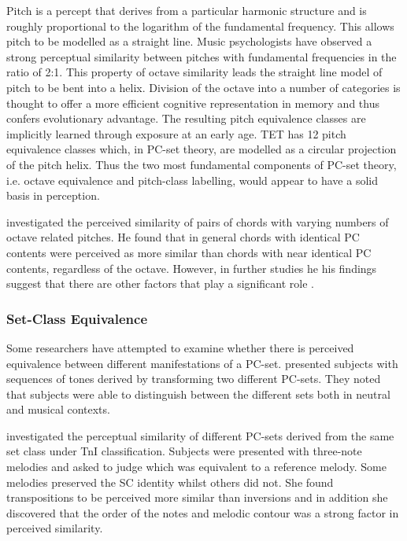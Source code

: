 \documentclass{article}
\begin{document}
Pitch is a percept that derives from a particular harmonic structure
and is roughly proportional to the logarithm of the fundamental
frequency. This allows pitch to be modelled as a straight line. Music
psychologists have observed a strong perceptual similarity between
pitches with fundamental frequencies in the ratio of 2:1. This
property of octave similarity leads the straight line model of pitch
to be bent into a helix. Division of the octave into a number of
categories is thought to offer a more efficient cognitive
representation in memory and thus confers evolutionary advantage. The
resulting pitch equivalence classes are implicitly learned through
exposure at an early age. TET has 12 pitch equivalence classes which,
in PC-set theory, are modelled as a circular projection of the pitch
helix. Thus the two most fundamental components of PC-set theory,
i.e. octave equivalence and pitch-class labelling, would appear to
have a solid basis in perception.

\citet{Gibson1988} investigated the perceived similarity of pairs of
chords with varying numbers of octave related pitches. He found that
in general chords with identical PC contents were perceived as more
similar than chords with near identical PC contents, regardless of
the octave. However, in further studies he his findings suggest that
there are other factors that play a significant role
\citep{Gibson1993}.
\subsubsection{Set-Class Equivalence}
\label{sec-3-5-2}

Some researchers have attempted to examine whether there is perceived
equivalence between different manifestations of a
PC-set. \citet{KrumhanslSandell1987} presented subjects with sequences
of tones derived by transforming two different PC-sets. They noted
that subjects were able to distinguish between the different sets both
in neutral and musical contexts.  

\citet{Millar1984} investigated the perceptual similarity of different
PC-sets derived from the same set class under TnI
classification. Subjects were presented with three-note melodies and
asked to judge which was equivalent to a reference melody. Some
melodies preserved the SC identity whilst others did not. She found
transpositions to be perceived more similar than inversions and in
addition she discovered that the order of the notes and melodic
contour was a strong factor in perceived similarity.
\end{document}
